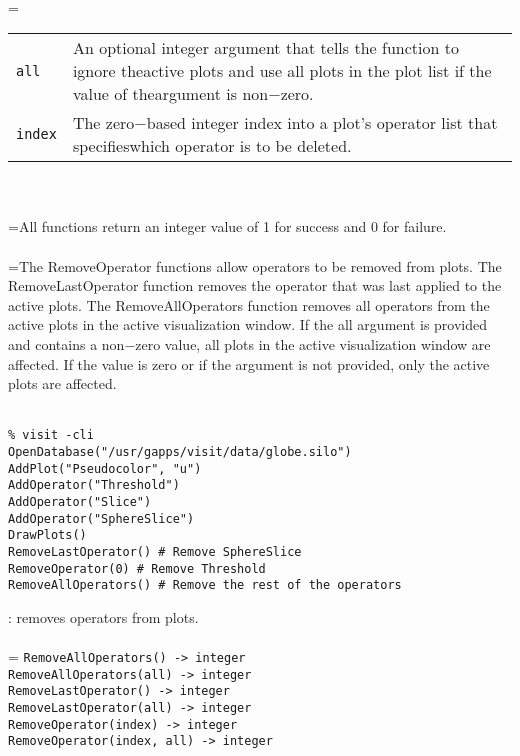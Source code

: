 \documentclass[10pt,a4paper]{report}
\begin{document}
 \\ 
\hangindent=\parindent 
\begin{tabular}{lp{9cm}}
\verb!all! & An optional integer argument that tells the function to ignore theactive plots and use all plots in the plot list if the value of theargument is non$-$zero. \\
\verb!index! & The zero$-$based integer index into a plot's operator list that specifieswhich operator is to be deleted. \\
\end{tabular} \\[-2mm]


 \\ 
\hangindent=\parindent All functions return an integer value of 1 for success and 0 for failure. \\[-3mm] 

 \\ 
\hangindent=\parindent The RemoveOperator functions allow operators to be removed from plots. The RemoveLastOperator function removes the operator that was last applied to the active plots. The RemoveAllOperators function removes all operators from the active plots in the active visualization window. If the all argument is provided and contains a non$-$zero value, all plots in the active visualization window are affected. If the value is zero or if the argument is not provided, only the active plots are affected. \\[-3mm] 

\\[-6mm]
\begin{verbatim}% visit -cli
OpenDatabase("/usr/gapps/visit/data/globe.silo")
AddPlot("Pseudocolor", "u")
AddOperator("Threshold")
AddOperator("Slice")
AddOperator("SphereSlice")
DrawPlots()
RemoveLastOperator() # Remove SphereSlice
RemoveOperator(0) # Remove Threshold
RemoveAllOperators() # Remove the rest of the operators
\end{verbatim}
\newpage


{}
: removes operators from plots.\\[-3mm]

 \\ 
\hangindent=\parindent 
\verb!RemoveAllOperators() -> integer!\\ 
\verb!RemoveAllOperators(all) -> integer!\\ 
\verb!RemoveLastOperator() -> integer!\\ 
\verb!RemoveLastOperator(all) -> integer!\\ 
\verb!RemoveOperator(index) -> integer!\\ 
\verb!RemoveOperator(index, all) -> integer!\\ [-3mm]
\end{document}
